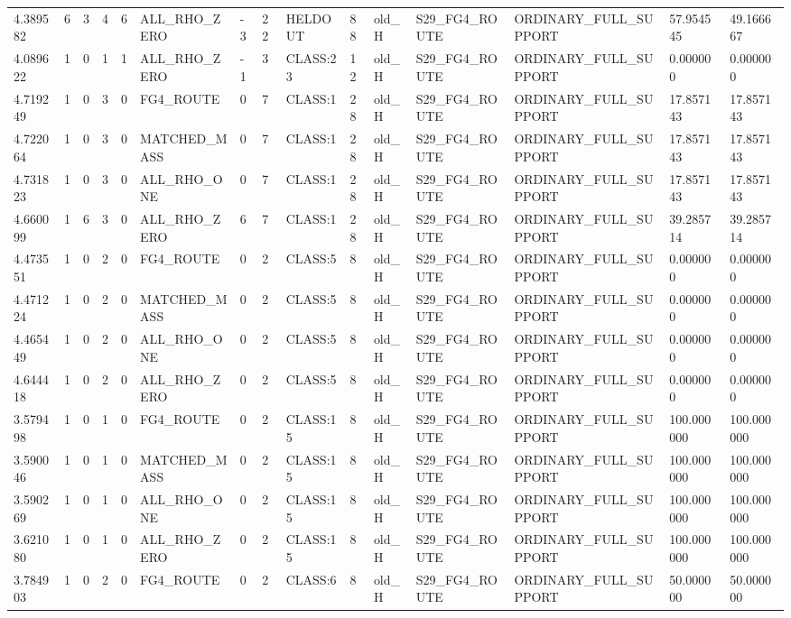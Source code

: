 \begin{tabular}{lllllllllllllll}
4.389582 & 6 & 3 & 4 & 6 & ALL\_RHO\_ZERO & -3 & 22 & HELDOUT & 88 & old\_H & S29\_FG4\_ROUTE & ORDINARY\_FULL\_SUPPORT & 57.954545 & 49.166667 \\
4.089622 & 1 & 0 & 1 & 1 & ALL\_RHO\_ZERO & -1 & 3 & CLASS:23 & 12 & old\_H & S29\_FG4\_ROUTE & ORDINARY\_FULL\_SUPPORT & 0.000000 & 0.000000 \\
4.719249 & 1 & 0 & 3 & 0 & FG4\_ROUTE & 0 & 7 & CLASS:1 & 28 & old\_H & S29\_FG4\_ROUTE & ORDINARY\_FULL\_SUPPORT & 17.857143 & 17.857143 \\
4.722064 & 1 & 0 & 3 & 0 & MATCHED\_MASS & 0 & 7 & CLASS:1 & 28 & old\_H & S29\_FG4\_ROUTE & ORDINARY\_FULL\_SUPPORT & 17.857143 & 17.857143 \\
4.731823 & 1 & 0 & 3 & 0 & ALL\_RHO\_ONE & 0 & 7 & CLASS:1 & 28 & old\_H & S29\_FG4\_ROUTE & ORDINARY\_FULL\_SUPPORT & 17.857143 & 17.857143 \\
4.660099 & 1 & 6 & 3 & 0 & ALL\_RHO\_ZERO & 6 & 7 & CLASS:1 & 28 & old\_H & S29\_FG4\_ROUTE & ORDINARY\_FULL\_SUPPORT & 39.285714 & 39.285714 \\
4.473551 & 1 & 0 & 2 & 0 & FG4\_ROUTE & 0 & 2 & CLASS:5 & 8 & old\_H & S29\_FG4\_ROUTE & ORDINARY\_FULL\_SUPPORT & 0.000000 & 0.000000 \\
4.471224 & 1 & 0 & 2 & 0 & MATCHED\_MASS & 0 & 2 & CLASS:5 & 8 & old\_H & S29\_FG4\_ROUTE & ORDINARY\_FULL\_SUPPORT & 0.000000 & 0.000000 \\
4.465449 & 1 & 0 & 2 & 0 & ALL\_RHO\_ONE & 0 & 2 & CLASS:5 & 8 & old\_H & S29\_FG4\_ROUTE & ORDINARY\_FULL\_SUPPORT & 0.000000 & 0.000000 \\
4.644418 & 1 & 0 & 2 & 0 & ALL\_RHO\_ZERO & 0 & 2 & CLASS:5 & 8 & old\_H & S29\_FG4\_ROUTE & ORDINARY\_FULL\_SUPPORT & 0.000000 & 0.000000 \\
3.579498 & 1 & 0 & 1 & 0 & FG4\_ROUTE & 0 & 2 & CLASS:15 & 8 & old\_H & S29\_FG4\_ROUTE & ORDINARY\_FULL\_SUPPORT & 100.000000 & 100.000000 \\
3.590046 & 1 & 0 & 1 & 0 & MATCHED\_MASS & 0 & 2 & CLASS:15 & 8 & old\_H & S29\_FG4\_ROUTE & ORDINARY\_FULL\_SUPPORT & 100.000000 & 100.000000 \\
3.590269 & 1 & 0 & 1 & 0 & ALL\_RHO\_ONE & 0 & 2 & CLASS:15 & 8 & old\_H & S29\_FG4\_ROUTE & ORDINARY\_FULL\_SUPPORT & 100.000000 & 100.000000 \\
3.621080 & 1 & 0 & 1 & 0 & ALL\_RHO\_ZERO & 0 & 2 & CLASS:15 & 8 & old\_H & S29\_FG4\_ROUTE & ORDINARY\_FULL\_SUPPORT & 100.000000 & 100.000000 \\
3.784903 & 1 & 0 & 2 & 0 & FG4\_ROUTE & 0 & 2 & CLASS:6 & 8 & old\_H & S29\_FG4\_ROUTE & ORDINARY\_FULL\_SUPPORT & 50.000000 & 50.000000 \\

\end{tabular}
